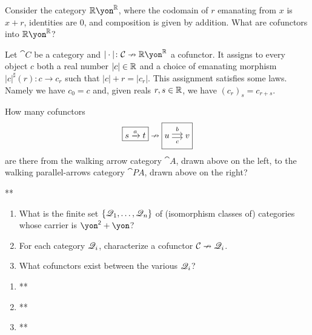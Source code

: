 \documentclass[Book-Poly]{subfiles}
\begin{document}
\begin{example}\label{ex.cof_to_rr} %
Consider the category $\rr\yon^\rr$, where the codomain of $r$ emanating from $x$ is $x+r$, identities are $0$, and composition is given by addition. What are cofunctors into $\rr\yon^\rr$?

Let $\cat{C}$ be a category and $|\cdot|\colon\cat{C}\cof\rr\yon^\rr$ a cofunctor. It assigns to every object $c$ both a real number $|c|\in\mathbb{R}$ and a choice of emanating morphism $|c|^\sharp(r)\colon c\to c_r$ such that $|c|+r=|c_r|$. This assignment satisfies some laws. Namely we have $c_0=c$ and, given reals $r,s\in\mathbb{R}$, we have $(c_r)_s=c_{r+s}$. 
\end{example}


\begin{exercise} %
How many cofunctors
\[
    \fbox{$s\To{a}t$}\cof\fbox{$u\Tto{b}{c}v$}
\]
are there from the walking arrow category $\cat{A}$, drawn above on the left, to the walking parallel-arrows category $\cat{P\!A}$, drawn above on the right?
\begin{solution}
**
\end{solution}
\end{exercise}

\begin{exercise}
\begin{enumerate}
	\item What is the finite set $\{\mathscr{Q}_1,\ldots,\mathscr{Q}_n\}$ of (isomorphism classes of) categories whose carrier is $\yon^\2+\yon$? %
	\item For each category $\mathscr{Q}_i$, characterize a cofunctor $\mathcal{C}\nrightarrow\mathscr{Q}_i$.
	\item What cofunctors exist between the various $\mathscr{Q}_i$?
\qedhere
\end{enumerate}
\begin{solution}
\begin{enumerate}
    \item **
    \item **
    \item **
\end{enumerate}
\end{solution}
\end{exercise}
\end{document}
